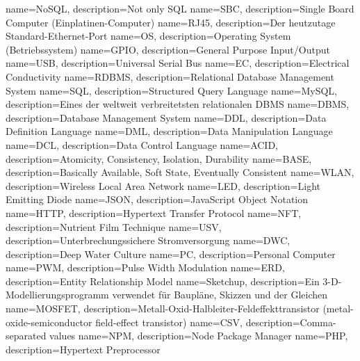  {name=NoSQL, description=Not only SQL}
 {name=SBC, description=Single Board Computer (Einplatinen-Computer)}
 {name=RJ45, description=Der heutzutage Standard-Ethernet-Port}
 {name=OS, description=Operating System (Betriebssystem)}
 {name=GPIO, description=General Purpose Input/Output}
 {name=USB, description=Universal Serial Bus}
 {name=EC, description=Electrical Conductivity}
 {name=RDBMS, description=Relational Database Management System}
 {name=SQL, description=Structured Query Language}
 {name=MySQL, description=Eines der weltweit verbreitetsten relationalen \gls{DBMS}}
 {name=DBMS, description=Database Management System}
 {name=DDL, description=Data Definition Language}
 {name=DML, description=Data Manipulation Language}
 {name=DCL, description=Data Control Language}
 {name=ACID, description={Atomicity, Consistency, Isolation, Durability}}
 {name=BASE, description={Basically Available, Soft State, Eventually Consistent}}
 {name=WLAN, description=Wireless Local Area Network}
 {name=LED, description=Light Emitting Diode}
 {name=JSON, description=JavaScript Object Notation}
 {name=HTTP, description=Hypertext Transfer Protocol}
 {name=NFT, description=Nutrient Film Technique}
 {name=USV, description=Unterbrechungssichere Stromversorgung}
 {name=DWC, description=Deep Water Culture}
 {name=PC, description=Personal Computer}
 {name=PWM, description=Pulse Width Modulation}
 {name=ERD, description=Entity Relationship Model}
 {name=Sketchup, description={Ein 3-D-Modellierungsprogramm verwendet für Baupläne, Skizzen und der Gleichen}}
 {name=MOSFET, description=Metall-Oxid-Halbleiter-Feldeffekttransistor (metal-oxide-semiconductor field-effect transistor)}
 {name=CSV, description=Comma-separated values}
 {name=NPM, description=Node Package Manager}
 {name=PHP, description=Hypertext Preprocessor}

\renewcommand*\glspostdescription{\dotfill}

